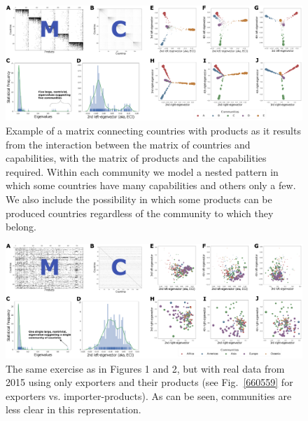 \documentclass[12pt]{article}
\begin{document}
\begin{figure}[h]
\begin{center}
\includegraphics[width=\textwidth]{allfigs_nested_wide.png}
\caption{{Example of a matrix connecting countries with products as it results
from the interaction between the matrix of countries and capabilities,
with the matrix of products and the capabilities required. Within each
community we model a nested pattern in which some countries have many
capabilities and others only a few. We also include the possibility in
which some products can be produced countries regardless of the
community to which they belong.~
{\label{369902}}%
}}
\end{center}
\end{figure}

\begin{figure}[h]
\begin{center}
\includegraphics[width=\textwidth]{allfigs_real_wide.png}
\caption{{The same exercise as in Figures 1 and 2, but with real data from 2015
using only exporters and their products (see
Fig.~{\ref{660559}} for exporters vs.
importer-products). As can be seen, communities are less clear in this
representation.
{\label{583738}}%
}}
\end{center}
\end{figure}
\end{document}
